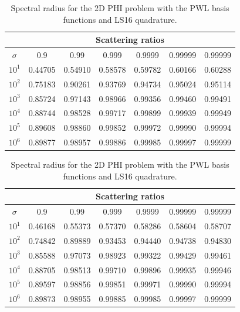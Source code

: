 \begin{table}
\caption{Spectral radius for the 2D PHI problem with the PWL basis functions and LS8 quadrature.}
\begin{center}
\def\arraystretch{1.6}
\begin{tabular}{|c|c|c|c|c|c|c|}
\hline
& \multicolumn{6}{c}{Scattering ratios}\vline\\
\hline
$\sigma$ & 0.9 & 0.99& 0.999& 0.9999& 0.99999& 0.99999 \\
\hline
$10^1$&0.44705&0.54910&0.58578&0.59782&0.60166&0.60288\\
$10^2$&0.75183&0.90261&0.93769&0.94734&0.95024&0.95114\\
$10^3$&0.85724&0.97143&0.98966&0.99356&0.99460&0.99491\\
$10^4$&0.88744&0.98528&0.99717&0.99899&0.99939&0.99949\\
$10^5$&0.89608&0.98860&0.99852&0.99972&0.99990&0.99994\\
$10^6$&0.89877&0.98957&0.99886&0.99985&0.99997&0.99999\\
\hline
\end{tabular}
\end{center}
\label{tab::DSA_2DPHI_LS8}
\vspace{2cm}
\caption{Spectral radius for the 2D PHI problem with the PWL basis functions and LS16 quadrature.}
\begin{center}
\def\arraystretch{1.6}
\begin{tabular}{|c|c|c|c|c|c|c|}
\hline
& \multicolumn{6}{c}{Scattering ratios}\vline\\
\hline
$\sigma$ & 0.9 & 0.99& 0.999& 0.9999& 0.99999& 0.99999 \\
\hline
$10^1$&0.46168&0.55373&0.57370&0.58286&0.58604&0.58707\\
$10^2$&0.74842&0.89889&0.93453&0.94440&0.94738&0.94830\\
$10^3$&0.85588&0.97073&0.98923&0.99322&0.99429&0.99461\\
$10^4$&0.88705&0.98513&0.99710&0.99896&0.99935&0.99946\\
$10^5$&0.89597&0.98856&0.99851&0.99971&0.99990&0.99994\\
$10^6$&0.89873&0.98955&0.99885&0.99985&0.99997&0.99999\\
\hline
\end{tabular}
\end{center}
\label{tab::DSA_2DPHI_LS16}
\end{table}

